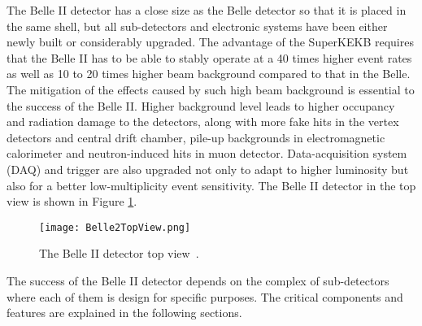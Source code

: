The Belle II detector has a close size as the Belle detector so that it is placed in the same shell, but all sub-detectors and electronic systems have been either newly built or considerably upgraded. The advantage of the SuperKEKB requires that the Belle II has to be able to stably operate at a 40 times higher event rates as well as 10 to 20 times higher beam background compared to that in the Belle. The mitigation of the effects caused by such high beam background is essential to the success of the Belle II. Higher background level leads to higher occupancy and radiation damage to the detectors, along with more fake hits in the vertex detectors and central drift chamber, pile-up backgrounds in electromagnetic calorimeter and neutron-induced hits in muon detector. Data-acquisition system (DAQ) and trigger are also upgraded not only to adapt to higher luminosity but also for a better low-multiplicity event sensitivity. The Belle II detector in the top view is shown in Figure \ref{fig:belle2_view}.

\begin{comment}
 and expected performances are summarized as follows: 


\textbullet \space vertex resolution of $B$ mesons of $\sim 50 \: \mu\text{m}$,

\textbullet \space excellent reconstruction efficiency for charged tracks down to several 100 MeV and fairly good efficiency for charged tracks down to $\sim$ 50 MeV,

\textbullet \space excellent momentum resolution up to 8 GeV/c,

\textbullet \space highly efficient particle identification to separate $\pi^{\pm}$, $\mu^{\pm}$, $e^{\pm}$, $K^{\pm}$ and $p$ at full energy range of experiment,

\textbullet \space full cover of experimental acceptance solid angle,

\textbullet \space ultra fast and highly efficiency DAQ and trigger system to cope with large data quantities and fast triggering frequency. 
\end{comment}

\begin{figure}[htbp]
	\centering 
	\texttt{[image: Belle2TopView.png]}
	\caption{The Belle II detector top view~\cite{b2book}.}
	\label{fig:belle2_view}
\end{figure}

The success of the Belle II detector depends on the complex of sub-detectors where each of them is design for specific purposes. The critical components and features are explained in the following sections. 

